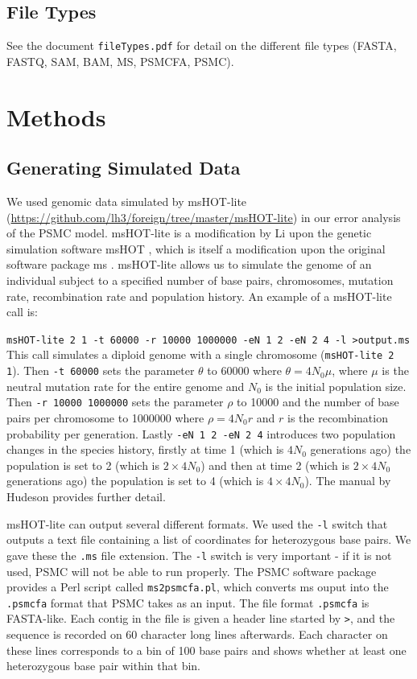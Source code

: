 \documentclass[11pt,a4paper]{article}
\begin{document}
\subsection{File Types}
See the document \verb|fileTypes.pdf| for detail on the different file types (FASTA, FASTQ, SAM, BAM, MS, PSMCFA, PSMC).


\section{Methods}\label{sec:methods}
\subsection{Generating Simulated Data} %
We used genomic data simulated by msHOT-lite (\url{https://github.com/lh3/foreign/tree/master/msHOT-lite}) in our error analysis of the PSMC model. msHOT-lite is a modification by Li upon the genetic simulation software msHOT \cite{hellenthal2007mshot}, which is itself a modification upon the original software package ms \cite{hudson2002generating}. msHOT-lite allows us to simulate the genome of an individual subject to a specified number of base pairs, chromosomes, mutation rate, recombination rate and population history. 
An example of a msHOT-lite call is: 

\verb|msHOT-lite 2 1 -t 60000 -r 10000 1000000 -eN 1 2 -eN 2 4 -l >output.ms| 
This call simulates a diploid genome with a single chromosome (\verb|msHOT-lite 2 1|). Then \verb|-t 60000| sets the parameter $\theta$ to 60000 where $\theta=4N_0\mu$, where $\mu$ is the neutral mutation rate for the entire genome and $N_0$ is the initial population size. Then \verb|-r 10000 1000000| sets the parameter $\rho$ to 10000 and the number of base pairs per chromosome to 1000000 where $\rho=4N_0r$ and $r$ is the recombination probability per generation. Lastly \verb|-eN 1 2 -eN 2 4| introduces two population changes in the species history, firstly at time 1 (which is $4N_0$ generations ago) the population is set to 2 (which is $2\times4N_0$) and then at time 2 (which is $2\times4N_0$ generations ago) the population is set to 4 (which is $4\times4N_0$). The manual by Hudeson \cite{hudson2002generating} provides further detail.

msHOT-lite can output several different formats. We used the \verb|-l| switch that outputs a text file containing a list of coordinates for heterozygous base pairs. We gave these the \verb|.ms| file extension. The \verb|-l| switch is very important - if it is not used, PSMC will not be able to run properly. The PSMC software package provides a Perl script called \verb|ms2psmcfa.pl|, which converts ms ouput into the \verb|.psmcfa| format that PSMC takes as an input. The file format \verb|.psmcfa| is FASTA-like. Each contig in the file is given a header line started by \verb|>|, and the sequence is recorded on 60 character long lines afterwards. Each character on these lines corresponds to a bin of 100 base pairs and shows whether at least one heterozygous base pair within that bin.
\end{document}
